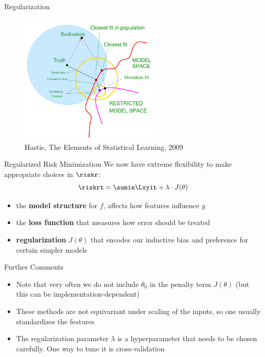 \begin{frame}{Regularization}

\begin{center}
\begin{figure}
\includegraphics[width=0.6\textwidth]{plots/biasvariance_scheme.png}
\caption{\footnotesize{Hastie, The Elements of Statistical Learning, 2009}}
\end{figure}
\end{center}

\end{frame}

\begin{frame}{Regularized Risk Minimization}
We now have extreme flexibility to make appropriate choices in
\(\riskr\): \[
\riskrt = \sumin \Lxyit + \lambda \cdot J(\theta)
\]

\begin{itemize}
\item the \textbf{model structure} for \(f\), affects how features influence \(y\)
\item the \textbf{loss function} that measures how error should be treated
\item \textbf{regularization} \(J(\theta)\) that encodes our inductive bias and preference for certain simpler models
\end{itemize}

\end{frame}


\begin{frame}{Further Comments}
\begin{itemize}
\item Note that very often we do not include $\theta_0$ in the penalty term $J(\theta)$ (but this can be implementation-dependent)
\item These methods are not equivariant under scaling of the inputs, so one usually standardizes the features
\item The regularization parameter \(\lambda\) is a hyperparameter that needs
to be chosen carefully. One way  to tune it  is cross-validation
\end{itemize}
\end{frame}



